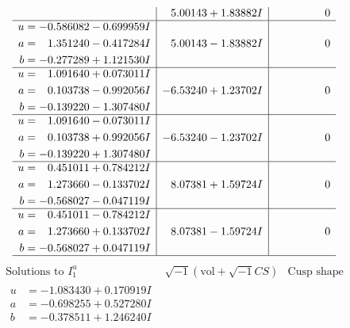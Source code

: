 \documentclass[1p]{elsarticle_modified}
\theoremstyle{definition}
\newcommand{\I}{\sqrt{-1}}
\begin{document}
$$\begin{array}{c|c|c}
 & \phantom{-}5.00143 + 1.83882 I & \phantom{-0.000000 } 0 \\ \hline\begin{aligned}
u &= -0.586082 - 0.699959 I \\
a &= \phantom{-}1.351240 - 0.417284 I \\
b &= -0.277289 + 1.121530 I\end{aligned}
 & \phantom{-}5.00143 - 1.83882 I & \phantom{-0.000000 } 0 \\ \hline\begin{aligned}
u &= \phantom{-}1.091640 + 0.073011 I \\
a &= \phantom{-}0.103738 - 0.992056 I \\
b &= -0.139220 - 1.307480 I\end{aligned}
 & -6.53240 + 1.23702 I & \phantom{-0.000000 } 0 \\ \hline\begin{aligned}
u &= \phantom{-}1.091640 - 0.073011 I \\
a &= \phantom{-}0.103738 + 0.992056 I \\
b &= -0.139220 + 1.307480 I\end{aligned}
 & -6.53240 - 1.23702 I & \phantom{-0.000000 } 0 \\ \hline\begin{aligned}
u &= \phantom{-}0.451011 + 0.784212 I \\
a &= \phantom{-}1.273660 - 0.133702 I \\
b &= -0.568027 - 0.047119 I\end{aligned}
 & \phantom{-}8.07381 + 1.59724 I & \phantom{-0.000000 } 0 \\ \hline\begin{aligned}
u &= \phantom{-}0.451011 - 0.784212 I \\
a &= \phantom{-}1.273660 + 0.133702 I \\
b &= -0.568027 + 0.047119 I\end{aligned}
 & \phantom{-}8.07381 - 1.59724 I & \phantom{-0.000000 } 0\\
 \hline 
 \end{array}$$\newpage$$\begin{array}{c|c|c}  
\text{Solutions to }I^u_{1}& \I (\text{vol} + \sqrt{-1}CS) & \text{Cusp shape}\\
 \hline 
\begin{aligned}
u &= -1.083430 + 0.170919 I \\
a &= -0.698255 + 0.527280 I \\
b &= -0.378511 + 1.246240 I\end{aligned}

\end{array}$$
\end{document}
